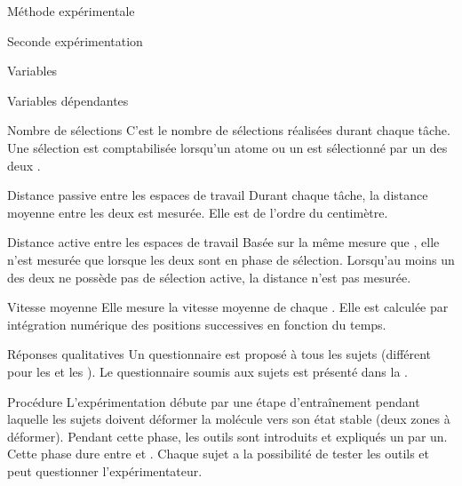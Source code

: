 \documentclass[myfrancais,ngerman,english,french]{mythesis}
\begin{document}
\begin{mychapter}{Méthode expérimentale}
\begin{mysection}{Seconde expérimentation}
\begin{mysubsection}{Variables}
\begin{mysubsubsection}{Variables dépendantes}
\begin{myparagraph}{ Nombre de sélections}
						C'est le nombre de sélections réalisées durant chaque tâche.
						Une sélection est comptabilisée lorsqu'un atome ou un  est sélectionné par un des deux .
					\end{myparagraph}
					\begin{myparagraph}{ Distance passive entre les espaces de travail}
						Durant chaque tâche, la distance moyenne entre les deux  est mesurée.
						Elle est de l'ordre du centimètre.
					\end{myparagraph}
					\begin{myparagraph}{ Distance active entre les espaces de travail}
						Basée sur la même mesure que , elle n'est mesurée que lorsque les deux  sont en phase de sélection.
						Lorsqu'au moins un des deux  ne possède pas de sélection active, la distance n'est pas mesurée.
					\end{myparagraph}
					\begin{myparagraph}{ Vitesse moyenne}
						Elle mesure la vitesse moyenne de chaque .
						Elle est calculée par intégration numérique des positions successives en fonction du temps.
					\end{myparagraph}
					\begin{myparagraph}{ Réponses qualitatives}
						Un questionnaire est proposé à tous les sujets (différent pour les  et les ).
						Le questionnaire soumis aux sujets est présenté dans la .
					\end{myparagraph}
				\end{mysubsubsection}
			\end{mysubsection}
			\begin{mysubsection}{Procédure}
				L'expérimentation débute par une étape d'entraînement pendant laquelle les sujets doivent déformer la molécule \myPrion vers son état stable (deux zones à déformer).
				Pendant cette phase, les outils sont introduits et expliqués un par un.
				Cette phase dure entre  et .
				Chaque sujet a la possibilité de tester les outils et peut questionner l'expérimentateur.


\end{mysubsection}
\end{mysection}
\end{mychapter}
\end{document}
